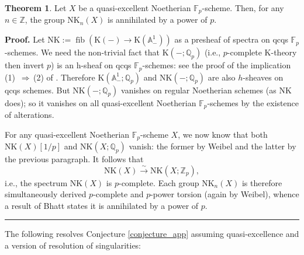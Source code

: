\documentclass[reqno,11pt,letterpaper]{amsart}
\theoremstyle{plain}
\numberwithin{equation}{subsection}
\newtheorem{theorem}[equation]{Theorem}
\theoremstyle{remark}
\theoremstyle{plain}
\theoremstyle{definition}\newtheorem*{notation}{Notation}
\newcommand{\bbA}{{\mathbb A}}
\newcommand{\bbF}{{\mathbb F}}
\newcommand{\bbQ}{{\mathbb Q}}
\newcommand{\bbZ}{{\mathbb Z}}
\newcommand{\bb}{\mathbb}
\newcommand{\op}{\operatorname}
\newcommand{\quis}{\stackrel{\sim}{\to}}
\newtheorem{theorem}{Theorem}
\newenvironment{proof}[1][Proof]{\noindent\textbf{#1.} }{\ \rule{0.5em}{0.5em}}
\newcommand{\RK}{\mathrm{K}}
\newcommand{\NK}{\mathrm{NK}}
\begin{document}
\begin{theorem}\label{theorem_app_EM}
Let $X$ be a quasi-excellent Noetherian $\bbF_p$-scheme. Then, for any $n\in\bbZ$, the group $\NK_n(X)$ is annihilated by a power of $p$.
\end{theorem}
\begin{proof}
Let $\NK:=\op{fib}(\RK(-)\to\RK(\bbA^1_-))$ as a presheaf of spectra on qcqs $\bb F_p$-schemes. We need the non-trivial fact that $\RK(-;\bbQ_p)$ (i.e., $p$-complete K-theory then invert $p$) is an h-sheaf on qcqs $\bbF_p$-schemes: see the proof of the implication (1)\, $\Rightarrow\, $(2) of 
\cite[Lem.~4.25]{ElmantoMorrow}. Therefore $\RK(\bbA_-^1;\bbQ_p)$ and $\NK(-;\bbQ_p)$ are also $h$-sheaves on qcqs schemes. But $\NK(-;\bbQ_p)$ vanishes on regular Noetherian schemes (as $\NK$ does); so it vanishes on all quasi-excellent Noetherian $\bbF_p$-schemes by the existence of alterations.

For any quasi-excellent Noetherian $\bb F_p$-scheme $X$, we now know that both $\NK(X)[1/p]$ and $\NK(X;\bbQ_p)$ vanish: the former by Weibel \cite[Corol.~3.3]{WMV} and the latter by the previous paragraph. It follows that \[\NK(X)\quis\NK(X;\bbZ_p),\] i.e., the spectrum $\NK(X)$ is $p$-complete. Each group $\NK_n(X)$ is therefore simultaneously derived $p$-complete and $p$-power torsion (again by Weibel), whence a result of Bhatt \cite{Bhatt_Small} states it is annihilated by a power of $p$.
\end{proof}

The following resolves Conjecture \ref{conjecture_app} assuming quasi-excellence and a version of resolution of singularities:
\end{document}
